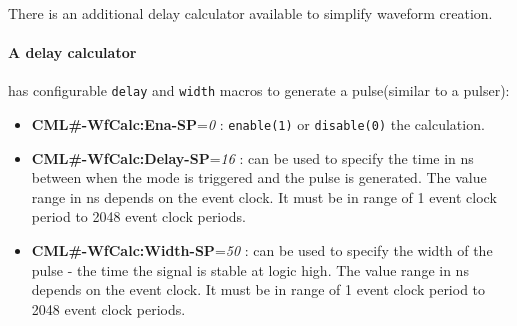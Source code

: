 \documentclass[12pt,a4paper]{article}
\begin{document}
\begin{itemize}
	There is an additional delay calculator available to simplify waveform creation. 
	\paragraph{A delay calculator} has configurable \texttt{delay} and \texttt{width} macros to generate a pulse(similar to a pulser):
	\begin{itemize}
	\item
	  \textbf{CML\#-WfCalc:Ena-SP}=\emph{0} : \texttt{enable(1)} or \texttt{disable(0)} the calculation.
	\item
	  \textbf{CML\#-WfCalc:Delay-SP}=\emph{16} : can be used to specify the time in ns between when the mode is triggered and the pulse is generated. The value range in ns depends on the event clock. It must be in range of 1 event clock period to 2048 event clock periods.
	\item
	  \textbf{CML\#-WfCalc:Width-SP}=\emph{50} : can be used to specify the width of the pulse - the time the signal is stable at logic high. The value range in ns depends on the event clock. It must be in range of 1 event clock period to 2048 event clock periods.
	\end{itemize}
	
	
\end{itemize}
\end{document}
